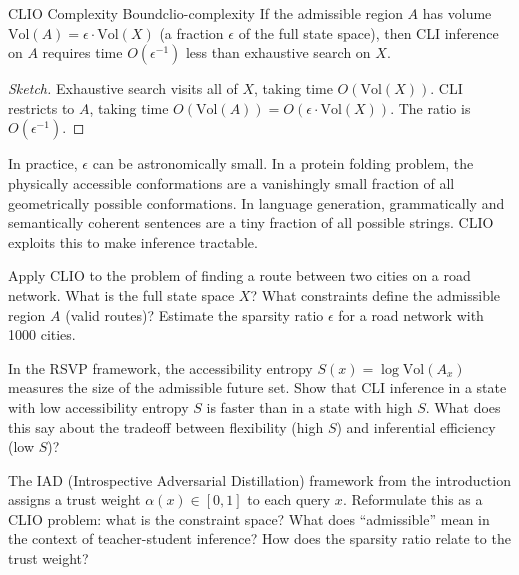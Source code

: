 \begin{theorem}{CLIO Complexity Bound}{clio-complexity}
  If the admissible region $A$ has volume $\mathrm{Vol}(A) = \epsilon \cdot
  \mathrm{Vol}(X)$ (a fraction $\epsilon$ of the full state space), then
  CLI inference on $A$ requires time $O(\epsilon^{-1})$ less than
  exhaustive search on $X$.
\end{theorem}

\begin{proof}[Sketch]
  Exhaustive search visits all of $X$, taking time $O(\mathrm{Vol}(X))$.
  CLI restricts to $A$, taking time $O(\mathrm{Vol}(A)) = O(\epsilon \cdot
  \mathrm{Vol}(X))$. The ratio is $O(\epsilon^{-1})$.
\end{proof}

In practice, $\epsilon$ can be astronomically small. In a protein folding
problem, the physically accessible conformations are a vanishingly small
fraction of all geometrically possible conformations. In language generation,
grammatically and semantically coherent sentences are a tiny fraction of
all possible strings. CLIO exploits this to make inference tractable.

\begin{exercise}
  Apply CLIO to the problem of finding a route between two cities on
  a road network. What is the full state space $X$? What constraints
  define the admissible region $A$ (valid routes)? Estimate the sparsity
  ratio $\epsilon$ for a road network with 1000 cities.
\end{exercise}

\begin{exercise}
  In the RSVP framework, the accessibility entropy $S(x) = \log \mathrm{Vol}(A_x)$
  measures the size of the admissible future set. Show that
  CLI inference in a state with low accessibility entropy $S$ is faster
  than in a state with high $S$. What does this say about the tradeoff
  between flexibility (high $S$) and inferential efficiency (low $S$)?
\end{exercise}

\begin{exercise}[title={Adversarial}]
  The IAD (Introspective Adversarial Distillation) framework from the
  introduction assigns a trust weight $\alpha(x) \in [0,1]$ to each
  query $x$. Reformulate this as a CLIO problem: what is the constraint
  space? What does ``admissible'' mean in the context of teacher-student
  inference? How does the sparsity ratio relate to the trust weight?
\end{exercise}

